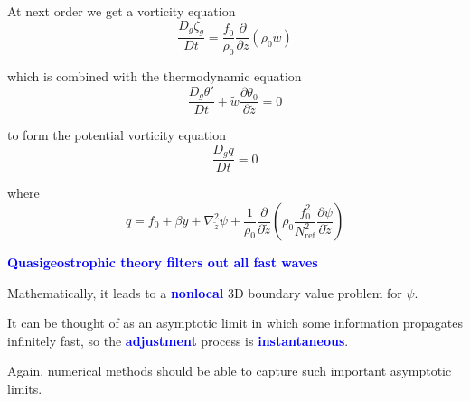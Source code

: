 \documentclass[a4]{seminar}
\newcommand{\B}[1]{\textcolor{blue}{#1}}
\begin{document}

\begin{slide}

At next order we get a vorticity equation
\begin{displaymath}
\frac{D_g \zeta_g}{Dt} =
\frac{f_0}{\rho_0} \frac{\partial}{\partial \tilde{z}} \left( \rho_0 \tilde{w} \right)
\end{displaymath}

which is combined with the thermodynamic equation
\begin{displaymath}
\frac{D_g \theta'}{Dt} + \tilde{w} \frac{\partial \theta_0}{\partial \tilde{z}} = 0
\end{displaymath}

to form the potential vorticity equation
\begin{displaymath}
\frac{D_g q}{Dt} = 0
\end{displaymath}

where
\begin{displaymath}
q = f_0 + \beta y + \nabla_{\tilde{z}}^2 \psi +
\frac{1}{\rho_0} \frac{\partial}{\partial \tilde{z}}
\left( \rho_0 \frac{f_0^2}{N^2_{\mathrm{ref}}} \frac{\partial \psi}{\partial \tilde{z}} \right) 
\end{displaymath}




\end{slide}


\begin{slide}

\B{\bf Quasigeostrophic theory filters out all fast waves}

\vspace{2mm}

Mathematically, it leads to a \B{\bf nonlocal} 3D boundary value problem for \( \psi \).

\vspace{2mm}

It can be thought of as an asymptotic limit in which some information
propagates infinitely fast, so the
\B{\bf adjustment} process is \B{\bf instantaneous}.

\vspace{2mm}

Again, numerical methods should be able to capture such important asymptotic
limits.


\end{slide}
\end{document}
